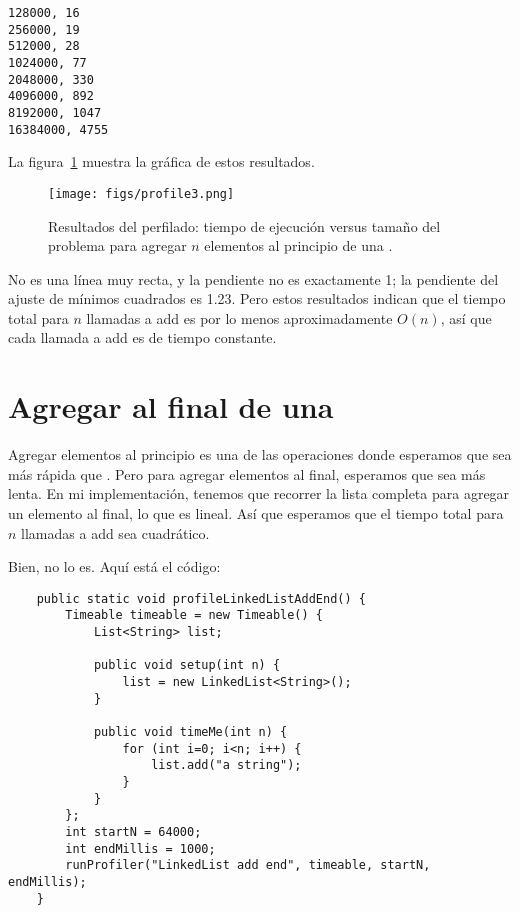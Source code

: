 \documentclass[12pt]{book}
\theoremstyle{exercise}
\begin{document}
\begin{verbatim}
128000, 16
256000, 19
512000, 28
1024000, 77
2048000, 330
4096000, 892
8192000, 1047
16384000, 4755
\end{verbatim}

La figura~\ref{fig-profile3}
muestra la gráfica de estos resultados.

\begin{figure}
\centering
\texttt{[image: figs/profile3.png]}
\caption{Resultados del perfilado: tiempo de ejecución versus tamaño del problema para
agregar $n$ elementos al principio de una .}
\label{fig-profile3}
\end{figure}

No es una línea muy recta, y la pendiente no es exactamente 1; la pendiente
del ajuste de mínimos cuadrados es 1.23. Pero estos resultados indican que
el tiempo total para $n$ llamadas a add es por lo menos aproximadamente $O(n)$,
así que cada llamada a add es de tiempo constante.


\section{Agregar al final de una }
\label{adding-to-the-end-of-a-linkedlist}

Agregar elementos al principio es una de las operaciones donde
esperamos que  sea más rápida que . Pero para
agregar elementos al final, esperamos que  sea más lenta.
En mi implementación, tenemos que recorrer la lista completa para agregar
un elemento al final, lo que es lineal. Así que esperamos que el tiempo total
para $n$ llamadas a add sea cuadrático.


Bien, no lo es. Aquí está el código:

\begin{verbatim}
    public static void profileLinkedListAddEnd() {
        Timeable timeable = new Timeable() {
            List<String> list;

            public void setup(int n) {
                list = new LinkedList<String>();
            }

            public void timeMe(int n) {
                for (int i=0; i<n; i++) {
                    list.add("a string");
                }
            }
        };
        int startN = 64000;
        int endMillis = 1000;
        runProfiler("LinkedList add end", timeable, startN, endMillis);
    }
\end{verbatim}
\end{document}
